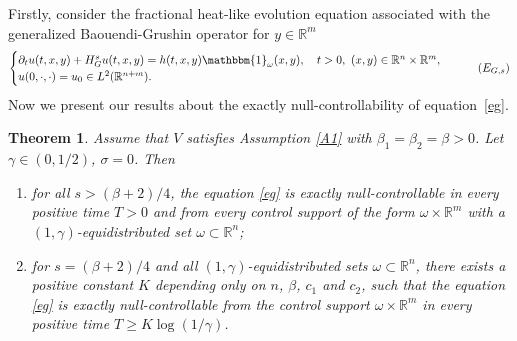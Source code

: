 \documentclass{article}
\numberwithin{equation}{section}
\newcommand\R{\ensuremath{\mathbb{R}}}
\newtheorem{theorem}{Theorem}[section]
\numberwithin{equation}{section}
\theoremstyle{definition}
\begin{document}
Firstly, consider the fractional heat-like evolution equation associated with the generalized Baouendi-Grushin operator for $y\in \R^{m}$
\begin{equation}\label{eg}
	\begin{cases}
		\partial_t u(t,x,y)+ H_{G}^s u(t,x,y)=h(t,x,y) \mathbbm{1}_{\omega}(x,y), \quad t>0,\,\, (x,y)\in \R^{n}\times \R^{m},\\
		u(0,\cdot ,\cdot )=u_0 \in L^2(\R^{n+m}).
	\end{cases}\tag{$E_{G,s}$}
\end{equation}
Now we present our results about the exactly null-controllability of equation~\eqref{eg}. 
\begin{theorem}\label{thm1.3}
	Assume that $V$ satisfies Assumption \ref{A1} with $\beta_1=\beta_2=\beta >0$. Let $\gamma \in (0,1 /2)$, $\sigma = 0$. Then
	\begin{enumerate}
		\item for all $s>(\beta+2) /4$, the equation \eqref{eg} is exactly null-controllable in every positive time $T>0$ and from every control support of the form $\omega \times \R^{m}$ with a $(1,\gamma)$-equidistributed set $\omega\subset \R^{n}$;
		\item for $s= (\beta+2) /4$ and all $(1,\gamma)$-equidistributed sets $\omega \subset \R^{n}$, there exists a positive constant $K$ depending only on  $n$, $\beta$, $c_1$ and $c_2$, such that the equation \eqref{eg} is exactly null-controllable from the control support $\omega\times \R^{m}$ in every positive time $T\ge K \log(1 /\gamma)$.
	\end{enumerate}
\end{theorem}
\end{document}
